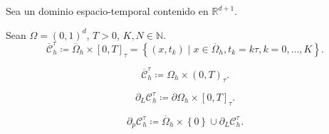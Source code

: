 Sea un dominio espacio-temporal contenido en $\mathbb{R}^{d+1}$.

\begin{definition}
    Sean
    \begin{math}
        \Omega=
        {\left(0,1\right)}^{d}
    \end{math},
    $T>0$, $K,N\in\mathbb{N}$.
    \begin{equation*}
        \overline{\mathcal{C}}^{\tau}_{h}\coloneqq
        \overline{\Omega}_{h}
        \times
        {\left[0,T\right]}_{\tau}=
        \left\{
        \left(x,t_{k}\right)\mid
        x\in\overline{\Omega}_{h},
        t_{k}=k\tau,
        k=0,\dotsc, K
        \right\}.
    \end{equation*}
\end{definition}

\begin{definition}
    \begin{equation*}
        \overline{\mathcal{C}}^{\tau}_{h}\coloneqq
        \Omega_{h}\times
        {\left(0,T\right)}_{\tau}.
    \end{equation*}
\end{definition}

\begin{definition}
    \begin{equation*}
        \partial_{L}
        \mathcal{C}^{\tau}_{h}\coloneqq
        \partial\Omega_{h}\times
        {\left[0,T\right]}_{\tau}.
    \end{equation*}
\end{definition}

\begin{definition}
    \begin{equation*}
        \partial_{p}
        \mathcal{C}^{\tau}_{h}\coloneqq
        \overline{\Omega}_{h}\times
        \left\{0\right\}\cup
        \partial_{L}
        \mathcal{C}^{\tau}_{h}.
    \end{equation*}
\end{definition}

